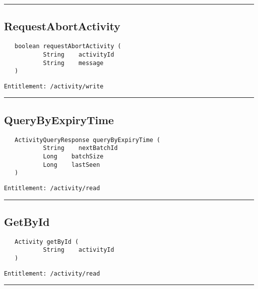 \rule{12cm}{2pt}
\subsection{RequestAbortActivity}
\label{Api:RequestAbortActivity}
\begin{Verbatim}
   boolean requestAbortActivity (
           String    activityId
           String    message
   )
\end{Verbatim}
\begin{Verbatim}[formatcom=\color{Maroon}]
  Entitlement: /activity/write
\end{Verbatim}



\rule{12cm}{2pt}
\subsection{QueryByExpiryTime}
\label{Api:QueryByExpiryTime}
\begin{Verbatim}
   ActivityQueryResponse queryByExpiryTime (
           String    nextBatchId
           Long    batchSize
           Long    lastSeen
   )
\end{Verbatim}
\begin{Verbatim}[formatcom=\color{Maroon}]
  Entitlement: /activity/read
\end{Verbatim}



\rule{12cm}{2pt}
\subsection{GetById}
\label{Api:GetById}
\begin{Verbatim}
   Activity getById (
           String    activityId
   )
\end{Verbatim}
\begin{Verbatim}[formatcom=\color{Maroon}]
  Entitlement: /activity/read
\end{Verbatim}



\rule{12cm}{2pt}
